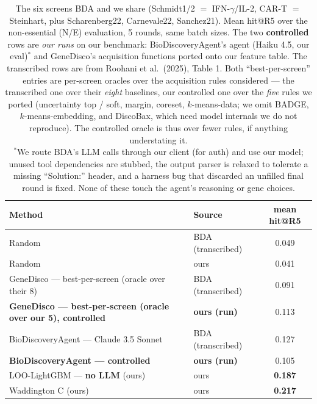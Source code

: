 \documentclass[11pt]{article}
\begin{document}
\begin{table}[H]
\centering
\caption{The six screens BDA and we share (Schmidt1/2 $=$ IFN-$\gamma$/IL-2, CAR-T $=$ Steinhart, plus
Scharenberg22, Carnevale22, Sanchez21). Mean hit@R5 over the non-essential (N/E) evaluation, 5 rounds,
same batch sizes. The two \textbf{controlled} rows are \emph{our runs} on our benchmark: BioDiscoveryAgent's
agent (Haiku 4.5, our eval)$^\ast$ and GeneDisco's acquisition functions ported onto our feature table.
The transcribed rows are from Roohani et al.\ (2025), Table 1. Both ``best-per-screen'' entries are
per-screen oracles over the acquisition rules considered --- the transcribed one over their \emph{eight}
baselines, our controlled one over the \emph{five} rules we ported (uncertainty top / soft, margin,
coreset, $k$-means-data; we omit BADGE, $k$-means-embedding, and DiscoBax, which need model internals we
do not reproduce). The controlled oracle is thus over fewer rules, if anything understating it.\\[2pt]
$^\ast$We route BDA's LLM calls through our client (for auth) and use our model; unused tool
dependencies are stubbed, the output parser is relaxed to tolerate a missing ``Solution:'' header, and a
harness bug that discarded an unfilled final round is fixed. None of these touch the agent's reasoning
or gene choices.}
\label{tab:external}
\small
\begin{tabular}{llc}
\toprule
Method & Source & mean hit@R5 \\
\midrule
Random                                        & BDA (transcribed) & 0.049 \\
Random                                        & ours              & 0.041 \\
\midrule
GeneDisco --- best-per-screen (oracle over their 8) & BDA (transcribed) & 0.091 \\
\textbf{GeneDisco --- best-per-screen (oracle over our 5), controlled} & \textbf{ours (run)} & 0.113 \\
BioDiscoveryAgent --- Claude 3.5 Sonnet       & BDA (transcribed) & 0.127 \\
\textbf{BioDiscoveryAgent --- controlled}     & \textbf{ours (run)} & 0.105 \\
\midrule
LOO-LightGBM --- \textbf{no LLM} (ours)       & ours              & \textbf{0.187} \\
Waddington C (ours)                           & ours              & \textbf{0.217} \\
\bottomrule
\end{tabular}
\end{table}
\end{document}
